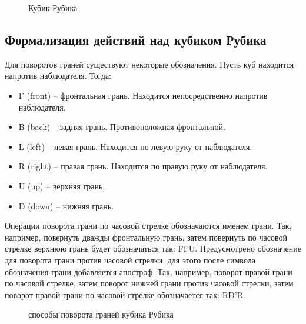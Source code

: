 \documentclass[a4paper, 14pt]{report} %
\begin{document}
	\begin{figure}[ht]
		\caption{Кубик Рубика}
		\label{rubicks_cube}
	\end{figure}

	\subsection{Формализация действий над кубиком Рубика}
	Для поворотов граней существуют некоторые обозначения. Пусть куб находится напротив наблюдателя. Тогда:
	
	\begin{itemize}
		\item F (front) – фронтальная грань. Находится непосредственно напротив наблюдателя.
		\item B (back) – задняя грань. Противоположная фронтальной.
		\item L (left) – левая грань. Находится по левую руку от наблюдателя.
		\item R (right) – правая грань. Находится по правую руку от наблюдателя.
		\item U (up) – верхняя грань.
		\item D (down) – нижняя грань.
	\end{itemize}

	Операции поворота грани по часовой стрелке обозначаются именем грани. Так, например, повернуть дважды фронтальную грань, затем повернуть по часовой стрелке верхнюю грань будет обозначаться так: FFU. Предусмотрено обозначение для поворота грани против часовой стрелки, для этого после символа обозначения грани добавляется апостроф. Так, например, поворот правой грани по часовой стрелке, затем поворот нижней грани против часовой стрелки, затем поворот правой грани по часовой стрелке обозначается так: RD’R.
	
	\begin{figure}[ht]
		\caption{способы поворота граней кубика Рубика}
		\label{cube_rotations}
	\end{figure}
	
\end{document}
